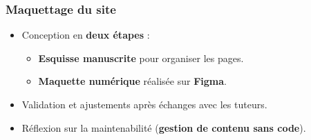 \documentclass[pdf]{beamer}
\begin{document}
\begin{frame}
    \frametitle{Maquettage du site}

    \begin{itemize}
        \item Conception en \textbf{deux étapes} :
              \begin{itemize}
                \item \textbf{Esquisse manuscrite} pour organiser les pages.
                \item \textbf{Maquette numérique} réalisée sur \textbf{Figma}.
              \end{itemize}
        \item Validation et ajustements après échanges avec les tuteurs.
        \item Réflexion sur la maintenabilité (\textbf{gestion de contenu sans code}).
    \end{itemize}
\end{frame}
\end{document}

